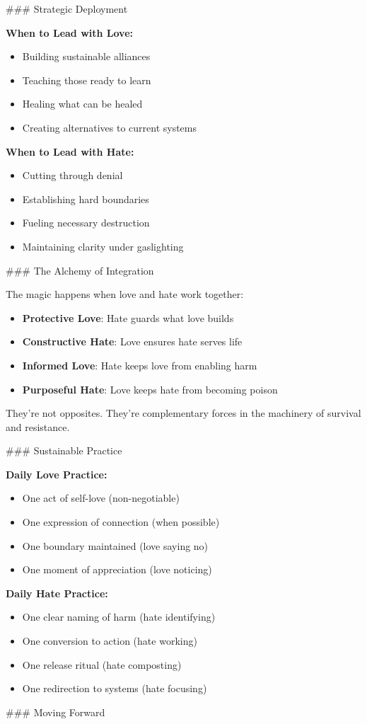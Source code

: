\documentclass[12pt]{book}
\begin{document}
\#\#\# Strategic Deployment

\textbf{When to Lead with Love:}
\begin{itemize}
\item Building sustainable alliances
\item Teaching those ready to learn
\item Healing what can be healed
\item Creating alternatives to current systems

\end{itemize}
\textbf{When to Lead with Hate:}
\begin{itemize}
\item Cutting through denial
\item Establishing hard boundaries
\item Fueling necessary destruction
\item Maintaining clarity under gaslighting

\end{itemize}
\#\#\# The Alchemy of Integration

The magic happens when love and hate work together:

\begin{itemize}
\item \textbf{Protective Love}: Hate guards what love builds
\item \textbf{Constructive Hate}: Love ensures hate serves life
\item \textbf{Informed Love}: Hate keeps love from enabling harm
\item \textbf{Purposeful Hate}: Love keeps hate from becoming poison

\end{itemize}
They're not opposites. They're complementary forces in the machinery of survival and resistance.

\#\#\# Sustainable Practice

\textbf{Daily Love Practice:}
\begin{itemize}
\item One act of self-love (non-negotiable)
\item One expression of connection (when possible)
\item One boundary maintained (love saying no)
\item One moment of appreciation (love noticing)

\end{itemize}
\textbf{Daily Hate Practice:}
\begin{itemize}
\item One clear naming of harm (hate identifying)
\item One conversion to action (hate working)
\item One release ritual (hate composting)
\item One redirection to systems (hate focusing)

\end{itemize}
\#\#\# Moving Forward
\end{document}
